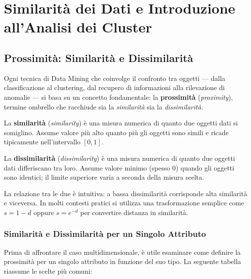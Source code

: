 \chapter{Similarità dei Dati e Introduzione all'Analisi dei Cluster}
\label{ch:similarity-clustering}


\section{Prossimità: Similarità e Dissimilarità}
\label{sec:proximity}

Ogni tecnica di Data Mining che coinvolge il confronto tra oggetti — dalla classificazione al clustering, dal recupero di informazioni alla rilevazione di anomalie — si basa su un concetto fondamentale: la \textbf{prossimità} (\textit{proximity}), termine ombrello che racchiude sia la \textit{similarità} sia la \textit{dissimilarità}.

\begin{definition}[Similarità]
La \textbf{similarità} (\textit{similarity}) è una misura numerica di quanto due oggetti dati si somiglino. Assume valore più alto quanto più gli oggetti sono simili e ricade tipicamente nell'intervallo $[0, 1]$.
\end{definition}

\begin{definition}[Dissimilarità]
La \textbf{dissimilarità} (\textit{dissimilarity}) è una misura numerica di quanto due oggetti dati differiscano tra loro. Assume valore minimo (spesso $0$) quando gli oggetti sono identici; il limite superiore varia a seconda della misura scelta.
\end{definition}

La relazione tra le due è intuitiva: a bassa dissimilarità corrisponde alta similarità e viceversa. In molti contesti pratici si utilizza una trasformazione semplice come $s = 1 - d$ oppure $s = e^{-d}$ per convertire distanza in similarità.

\subsection{Similarità e Dissimilarità per un Singolo Attributo}

Prima di affrontare il caso multidimensionale, è utile esaminare come definire la prossimità per un singolo attributo in funzione del suo tipo. La seguente tabella riassume le scelte più comuni:

